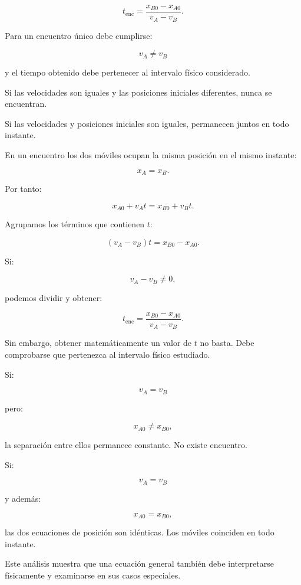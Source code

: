 \begin{respuesta}
\[ \boxed{t_{\mathrm{enc}}=\frac{x_{B0}-x_{A0}}{v_A-v_B}}. \]

Para un encuentro único debe cumplirse:

\[ v_A\neq v_B \]

y el tiempo obtenido debe pertenecer al intervalo físico considerado.

Si las velocidades son iguales y las posiciones iniciales diferentes, nunca se encuentran.

Si las velocidades y posiciones iniciales son iguales, permanecen juntos en todo instante.
\end{respuesta}

\begin{explicacion}
En un encuentro los dos móviles ocupan la misma posición en el mismo instante:

\[ x_A=x_B. \]

Por tanto:

\[
x_{A0}+v_At
=
x_{B0}+v_Bt.
\]

Agrupamos los términos que contienen \(t\):

\[
(v_A-v_B)t
=
x_{B0}-x_{A0}.
\]

Si:

\[ v_A-v_B\neq0, \]

podemos dividir y obtener:

\[ \boxed{t_{\mathrm{enc}}=\frac{x_{B0}-x_{A0}}{v_A-v_B}}. \]

Sin embargo, obtener matemáticamente un valor de \(t\) no basta. Debe comprobarse que pertenezca al intervalo físico estudiado.

Si:

\[ v_A=v_B \]

pero:

\[ x_{A0}\neq x_{B0}, \]

la separación entre ellos permanece constante. No existe encuentro.

Si:

\[
v_A=v_B
\]

y además:

\[
x_{A0}=x_{B0},
\]

las dos ecuaciones de posición son idénticas. Los móviles coinciden en todo instante.

Este análisis muestra que una ecuación general también debe interpretarse físicamente y examinarse en sus casos especiales.
\end{explicacion}


